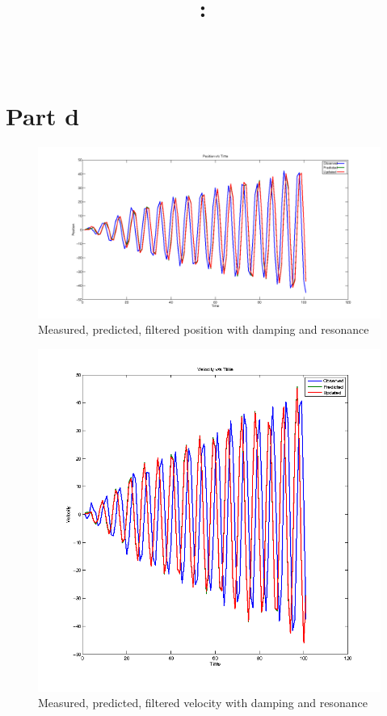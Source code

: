 \documentclass[12pt,english]{article}
\title{
\vspace{2in}
\textmd{\textbf{\hmwkClass:\ \hmwkTitle}}\\
}
\author{\textbf{\hmwkAuthorName} \\
        \textbf{\hmwkAuthorID}
        }
\date{} %
\begin{document}
\maketitle
\newpage

\section{Part d}

\begin{figure}
    \includegraphics[width=\linewidth]{kalman-position-damping}
    \caption{Measured, predicted, filtered position with damping and resonance}
\end{figure}

\begin{figure}
    \includegraphics[width=\linewidth]{kalman-velocity-damping}
    \caption{Measured, predicted, filtered velocity with damping and resonance}
\end{figure}
\end{document}
